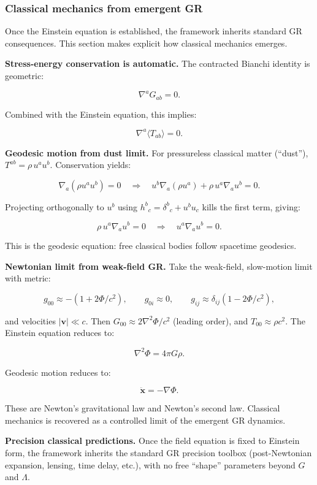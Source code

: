 \documentclass[11pt,a4paper]{article}
\theoremstyle{remark}
\begin{document}
\subsubsection{Classical mechanics from emergent GR}\label{classical-mechanics-from-emergent-gr}

Once the Einstein equation is established, the framework inherits standard GR
consequences. This section makes explicit how classical mechanics emerges.

\textbf{Stress-energy conservation is automatic.} The contracted Bianchi identity
is geometric:

\[
\nabla^a G_{ab} = 0.
\]

Combined with the Einstein equation, this implies:

\[
\nabla^a \langle T_{ab} \rangle = 0.
\]

\textbf{Geodesic motion from dust limit.} For pressureless classical matter (``dust''),
\(T^{ab} = \rho \, u^a u^b\). Conservation yields:

\[
\nabla_a(\rho u^a u^b) = 0
\quad \Rightarrow \quad
u^b \nabla_a(\rho u^a) + \rho \, u^a \nabla_a u^b = 0.
\]

Projecting orthogonally to \(u^b\) using \(h^b{}_c = \delta^b{}_c + u^b u_c\) kills
the first term, giving:

\[
\rho \, u^a \nabla_a u^b = 0
\quad \Rightarrow \quad
u^a \nabla_a u^b = 0.
\]

This is the geodesic equation: free classical bodies follow spacetime geodesics.

\textbf{Newtonian limit from weak-field GR.} Take the weak-field, slow-motion limit
with metric:

\[
g_{00} \approx -(1 + 2\Phi/c^2), \qquad
g_{0i} \approx 0, \qquad
g_{ij} \approx \delta_{ij}(1 - 2\Phi/c^2),
\]

and velocities \(|\mathbf{v}| \ll c\). Then \(G_{00} \approx 2\nabla^2\Phi/c^2\)
(leading order), and \(T_{00} \approx \rho c^2\). The Einstein equation reduces to:

\[
\nabla^2 \Phi = 4\pi G \rho.
\]

Geodesic motion reduces to:

\[
\ddot{\mathbf{x}} = -\nabla \Phi.
\]

These are Newton's gravitational law and Newton's second law. Classical
mechanics is recovered as a controlled limit of the emergent GR dynamics.

\textbf{Precision classical predictions.} Once the field equation is fixed to
Einstein form, the framework inherits the standard GR precision toolbox
(post-Newtonian expansion, lensing, time delay, etc.), with no free ``shape''
parameters beyond \(G\) and \(\Lambda\).
\end{document}
